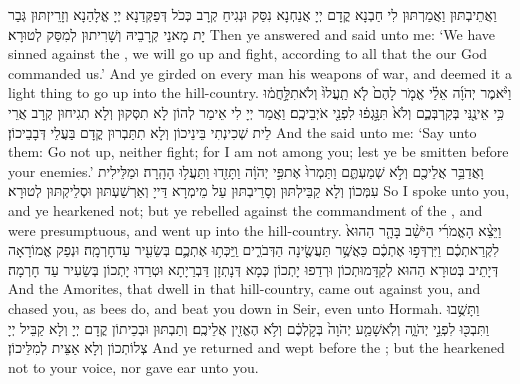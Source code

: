 {וַאֲתֵיבְתּוּן וַאֲמַרְתּוּן לִי חַבְנָא קֳדָם יְיָ אֲנַחְנָא נִסַּק וּנְגִיחַ קְרָב כְּכֹל דְּפַקְּדַנָא יְיָ אֱלָהַנָא וְזָרֵיזְתּוּן גְּבַר יָת מָאנֵי קְרָבֵיהּ וְשָׁרִיתוּן לְמִסַּק לְטוּרָא׃}
{Then ye answered and said unto me: ‘We have sinned against the \lord, we will go up and fight, according to all that the \lord\space our God commanded us.’ And ye girded on every man his weapons of war, and deemed it a light thing to go up into the hill-country.}{}
{וַיֹּ֨אמֶר יְהֹוָ֜ה אֵלַ֗י אֱמֹ֤ר לָהֶם֙ לֹ֤א תַֽעֲלוּ֙ וְלֹא\maqqaf תִלָּ֣חֲמ֔וּ כִּ֥י אֵינֶ֖נִּי בְּקִרְבְּכֶ֑ם וְלֹא֙ תִּנָּ֣גְפ֔וּ לִפְנֵ֖י אֹיְבֵיכֶֽם׃}
{וַאֲמַר יְיָ לִי אֵימַר לְהוֹן לָא תִסְּקוּן וְלָא תְגִיחוּן קְרָב אֲרֵי לֵית שְׁכִינְתִי בֵּינֵיכוֹן וְלָא תִתַּבְרוּן קֳדָם בַּעֲלֵי דְּבָבֵיכוֹן׃}
{And the \lord\space said unto me: ‘Say unto them: Go not up, neither fight; for I am not among you; lest ye be smitten before your enemies.’}{}
{וָאֲדַבֵּ֥ר אֲלֵיכֶ֖ם וְלֹ֣א שְׁמַעְתֶּ֑ם וַתַּמְרוּ֙ אֶת\maqqaf פִּ֣י יְהֹוָ֔ה וַתָּזִ֖דוּ וַתַּעֲל֥וּ הָהָֽרָה׃}
{וּמַלֵּילִית עִמְּכוֹן וְלָא קַבֵּילְתּוּן וְסָרֵיבְתּוּן עַל מֵימְרָא דַּייָ וְאַרְשַׁעְתּוּן וּסְלֵיקְתּוּן לְטוּרָא׃}
{So I spoke unto you, and ye hearkened not; but ye rebelled against the commandment of the \lord, and were presumptuous, and went up into the hill-country.}{}
{וַיֵּצֵ֨א הָאֱמֹרִ֜י הַיֹּשֵׁ֨ב בָּהָ֤ר הַהוּא֙ לִקְרַאתְכֶ֔ם וַיִּרְדְּפ֣וּ אֶתְכֶ֔ם כַּאֲשֶׁ֥ר תַּעֲשֶׂ֖ינָה הַדְּבֹרִ֑ים וַֽיַּכְּת֥וּ אֶתְכֶ֛ם בְּשֵׂעִ֖יר עַד\maqqaf חׇרְמָֽה׃}
{וּנְפַק אֱמוֹרָאָה דְּיָתֵיב בְּטוּרָא הַהוּא לְקַדָּמוּתְכוֹן וּרְדַפוּ יָתְכוֹן כְּמָא דְּנָתְזָן דַּבְרַיָתָא וּטְרַדוּ יָתְכוֹן בְּשֵׂעִיר עַד חָרְמָה׃}
{And the Amorites, that dwell in that hill-country, came out against you, and chased you, as bees do, and beat you down in Seir, even unto Hormah.}{}
{וַתָּשֻׁ֥בוּ וַתִּבְכּ֖וּ לִפְנֵ֣י יְהֹוָ֑ה וְלֹֽא\maqqaf שָׁמַ֤ע יְהֹוָה֙ בְּקֹ֣לְכֶ֔ם וְלֹ֥א הֶאֱזִ֖ין אֲלֵיכֶֽם׃}
{וְתַבְתּוּן וּבְכֵיתוֹן קֳדָם יְיָ וְלָא קַבֵּיל יְיָ צְלוֹתְכוֹן וְלָא אַצֵּית לְמִלֵּיכוֹן׃}
{And ye returned and wept before the \lord; but the \lord\space hearkened not to your voice, nor gave ear unto you.}{}
